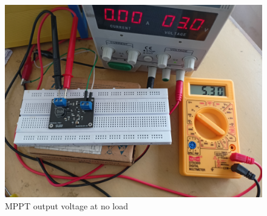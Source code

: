 \begin{figure}[H]
	\centering
	\includegraphics[width=0.7\columnwidth]{IMGS/TestSetupPics/MPPT_out.jpg}
	\caption{MPPT output voltage at no load}
	\label{fig:arch}
\end{figure}



